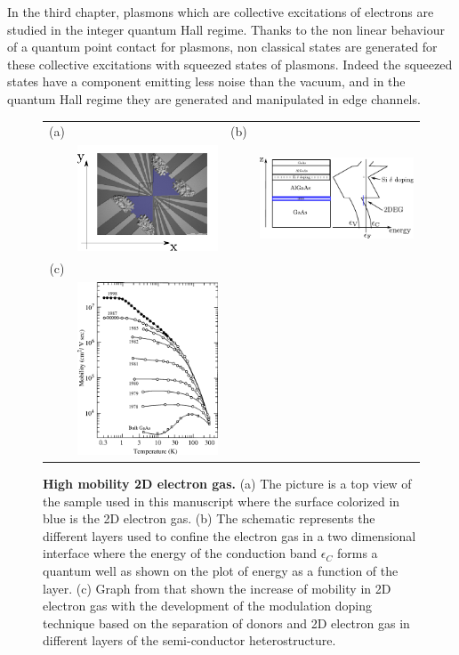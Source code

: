 In the third chapter, plasmons which are collective excitations of electrons are studied in the integer quantum Hall regime.
Thanks to the non linear behaviour of a quantum point contact for plasmons, non classical states are generated for these collective excitations with squeezed states of plasmons.
Indeed the squeezed states have a component emitting less noise than the vacuum, and in the quantum Hall regime they are generated and manipulated in edge channels.

\vspace{1 cm}

\begin{figure}[hptb]
	\begin{center}
		\begin{tabular}{c c c c}
			(a) & & (b) & \\
			& \includegraphics[width = 4 cm]{./intro/heterostructure_top_view}
			& &
			\includegraphics[width = 4 cm]{./intro/heterostructure_band_diagram} \\
			(c) & &  & \\
			& \includegraphics[width = 4 cm]{./intro/high_mobility}
			& &
			
		\end{tabular}
	\end{center}
	
	\caption{\textbf{High mobility 2D electron gas.} (a) The picture is a top view of the sample used in this manuscript where the surface colorized in blue is the 2D electron gas. (b) The schematic represents the different layers used to confine the electron gas in a two dimensional interface where the energy of the conduction band $\epsilon_{C}$ forms a quantum well as shown on the plot of energy as a function of the layer. (c) Graph from \cite{stormer1999nobel} that shown the increase of mobility in 2D electron gas with the development of the modulation doping technique based on the separation of donors and 2D electron gas in different layers of the semi-conductor heterostructure.}
	\label{fig: 2DEG}
\end{figure}

